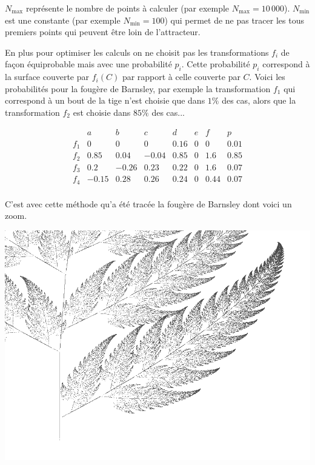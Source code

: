 \documentclass[11pt,class=report,crop=false]{standalone}
\begin{document}
\bigskip

$N_{\max}$ représente le nombre de points à calculer (par exemple $N_{\max} = 10\,000$).
$N_{\min}$ est une constante (par exemple $N_{\min} = 100$) qui permet de ne pas tracer les tous premiers points
qui peuvent être loin de l'attracteur.


En plus pour optimiser les calculs on ne choisit pas les transformations $f_i$ de façon équiprobable mais 
avec une probabilité $p_i$. Cette probabilité $p_i$ correspond à la surface couverte par $f_i(C)$ par rapport à celle couverte par $C$. Voici les probabilités pour la fougère de Barnsley, par exemple la transformation
$f_1$ qui correspond à un bout de la tige n'est choisie que dans $1\%$ des cas, alors que la transformation
$f_2$ est choisie dans $85\%$ des cas...


\begin{displaymath}
\begin{array}{c|ccccccc}
     & a & b & c & d & e & f & p\\
\hline
f_1 & 0 & 0 & 0 & 0.16 & 0 & 0 & 0.01\\
\hline
f_2  & 0.85 &0.04&-0.04&0.85&0&1.6 & 0.85 \\
\hline
f_3 & 0.2 & -0.26 & 0.23 & 0.22 & 0 & 1.6 & 0.07 \\
\hline
f_4  & -0.15 & 0.28 & 0.26 & 0.24 & 0 & 0.44 & 0.07 \\
\end{array}
\end{displaymath}

C'est avec cette méthode qu'a été tracée la fougère de Barnsley dont voici un zoom.

\begin{center}
 \includegraphics[scale=.2]{images/IFS-fern2.png} 
\end{center}
\end{document}
